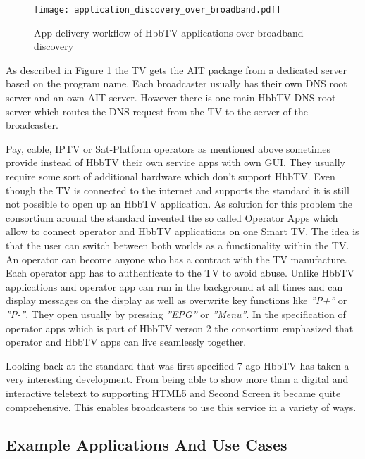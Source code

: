 \begin{figure}[htb]
  \centering
  \texttt{[image: application\_discovery\_over\_broadband.pdf]}\\
  \caption{App delivery workflow of HbbTV applications over broadband discovery}\label{fig:application_discovery_over_broadband}
\end{figure}

As described in Figure \ref{fig:application_discovery_over_broadband} the TV gets the AIT package
from a dedicated server based on the program name. Each broadcaster usually has their own DNS
root server and an own AIT server. However there is one main HbbTV DNS root server which routes the
DNS request from the TV to the server of the broadcaster.

Pay, cable, IPTV or Sat-Platform operators as mentioned above sometimes provide instead of HbbTV
their own service apps with own GUI. They usually require some sort of additional hardware which
don't support HbbTV. Even though the TV is connected to the internet and supports the standard
it is still not possible to open up an HbbTV application. As solution for this problem the
consortium around the standard invented the so called Operator Apps which allow to connect
operator and HbbTV applications on one Smart TV. The idea is that the user can switch between
both worlds as a functionality within the TV. An operator can become anyone who has a contract
with the TV manufacture. Each operator app has to authenticate to the TV to avoid abuse. Unlike
HbbTV applications and operator app can run in the background at all times and can display
messages on the display as well as overwrite key functions like \textit{''P+''} or \textit{''P-''}.
They open usually by pressing \textit{''EPG''} or \textit{''Menu''}. In the specification of
operator apps which is part of HbbTV verson 2 the consortium emphasized that operator and HbbTV
apps can live seamlessly together.

Looking back at the standard that was first specified 7 ago HbbTV has taken a very interesting
development. From being able to show more than a digital and interactive teletext to supporting
HTML5 and Second Screen it became quite comprehensive. This enables broadcasters to use this
service in a variety of ways.

\subsection{Example Applications And Use Cases}

